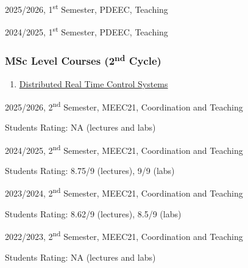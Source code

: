 \documentclass[
]{article}
\begin{document}
2025/2026, 1\textsuperscript{st} Semester, PDEEC, Teaching

2024/2025, 1\textsuperscript{st} Semester, PDEEC, Teaching

\subsubsection{\texorpdfstring{MSc Level Courses (2\textsuperscript{nd}
Cycle)}{MSc Level Courses (2nd Cycle)}}\label{msc-level-courses-2nd-cycle}

\begin{enumerate}
\def\labelenumi{\arabic{enumi}.}
\setcounter{enumi}{1}
\item
  \ul{Distributed Real Time Control Systems}
\end{enumerate}

2025/2026, 2\textsuperscript{nd} Semester, MEEC21, Coordination and
Teaching

Students Rating: NA (lectures and labs)

2024/2025, 2\textsuperscript{nd} Semester, MEEC21, Coordination and
Teaching

Students Rating: 8.75/9 (lectures), 9/9 (labs)

2023/2024, 2\textsuperscript{nd} Semester, MEEC21, Coordination and
Teaching

Students Rating: 8.62/9 (lectures), 8.5/9 (labs)

2022/2023, 2\textsuperscript{nd} Semester, MEEC21, Coordination and
Teaching

Students Rating: NA (lectures and labs)
\end{document}

